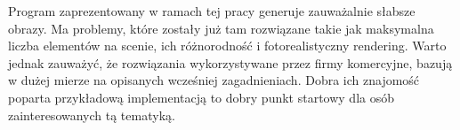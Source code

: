 \documentclass[inz,shortabstract]{iithesis}
\begin{document}
        Program zaprezentowany w ramach tej pracy generuje zauważalnie słabsze obrazy. Ma problemy, które zostały już tam rozwiązane takie jak maksymalna liczba elementów na scenie, ich różnorodność i fotorealistyczny rendering. Warto jednak zauważyć, że rozwiązania wykorzystywane przez firmy komercyjne, bazują w dużej mierze na opisanych wcześniej zagadnieniach. Dobra ich znajomość poparta przykładową implementacją to dobry punkt startowy dla osób zainteresowanych tą tematyką.
        




\end{document}
